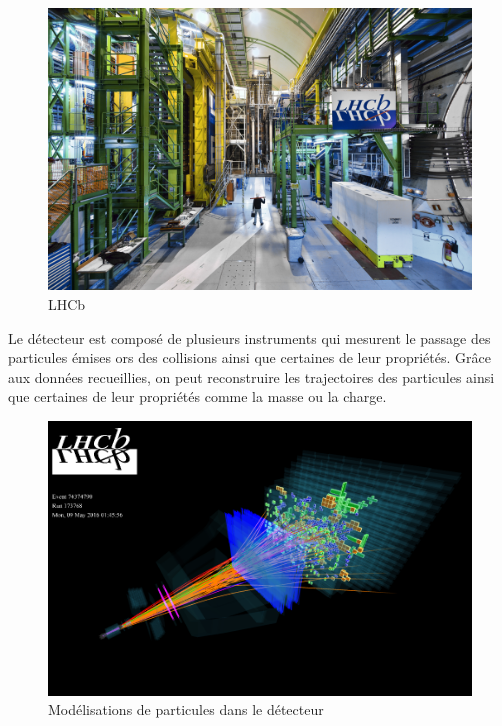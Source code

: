 \documentclass[a4paper]{report}
\begin{document}
        \begin{figure}[H]
            \includegraphics[width=\textwidth, center]{LHCb.jpg}
            \caption{LHCb}
            \label{LHCb}
        \end{figure}

        Le détecteur est composé de plusieurs instruments qui mesurent le passage des particules émises ors des collisions ainsi que certaines de leur propriétés.
        Grâce aux données recueillies, on peut reconstruire les trajectoires des particules ainsi que certaines de leur propriétés comme la masse ou la charge.

        \begin{figure}[!htb]
            \includegraphics[width=\textwidth, center]{LHCb_3D.png}
            \caption{Modélisations de particules dans le détecteur}
            \label{LHCb_3D}
        \end{figure}
\end{document}
